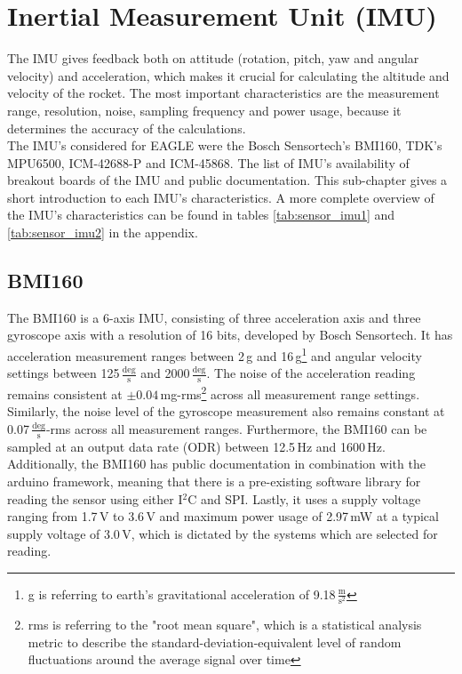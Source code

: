\documentclass[fontsize=11pt,%
twoside,%
BCOR          = 8mm, %
DIV           = 11,  %
titlepage     = off,%
index=totoc,%
xcolor        = pdftex,%
dvipsnames,%
bibliography  = totoc,%
bibliography = numbered, %
listof        = notnumbered]{scrreprt}
\begin{document}
\section{Inertial Measurement Unit (IMU)}
The IMU gives feedback both on attitude (rotation, pitch, yaw and angular velocity) and acceleration, which makes it crucial for calculating the altitude and velocity of the rocket. The most important characteristics are the measurement range, resolution, noise, sampling frequency and power usage, because it determines the accuracy of the calculations.\\
The IMU's considered for EAGLE were the Bosch Sensortech's BMI160, TDK's MPU6500, ICM-42688-P and ICM-45868. The list of IMU's availability of breakout boards of the IMU and public documentation. This sub-chapter gives a short introduction to each IMU's characteristics. A more complete overview of the IMU's characteristics  can be found in tables \ref{tab:sensor_imu1} and \ref{tab:sensor_imu2} in the appendix.

\subsection{BMI160}
The BMI160 is a 6-axis IMU, consisting of three acceleration axis and three gyroscope axis with a resolution of 16 bits, developed by Bosch Sensortech. It has acceleration measurement ranges between 2\,g and 16\,g\footnote{g is referring to earth's gravitational acceleration of 9.18\,$\frac{\text{m}}{\text{s}^2}$} and angular velocity settings between 125\,$\frac{\text{deg}}{\text{s}}$ and 2000\,$\frac{\text{deg}}{\text{s}}$. The noise of the acceleration reading remains consistent at $\pm 0.04$\,mg-rms\footnote{rms is referring to the "root mean square", which is a statistical analysis metric to describe the standard-deviation-equivalent level of random fluctuations around the average signal over time} across all measurement range settings. Similarly, the noise level of the gyroscope measurement also remains constant at 0.07\,$\frac{\text{deg}}{\text{s}}$-rms across all measurement ranges. Furthermore, the BMI160 can be sampled at an output data rate (ODR) between 12.5\,Hz and 1600\,Hz. Additionally, the BMI160 has public documentation in combination with the arduino framework, meaning that there is a pre-existing software library for reading the sensor using either I$^2$C and SPI. Lastly, it uses a supply voltage ranging from 1.7\,V to 3.6\,V and maximum power usage of 2.97\,mW at a typical supply voltage of 3.0\,V, which is dictated by the systems which are selected for reading.
\end{document}
